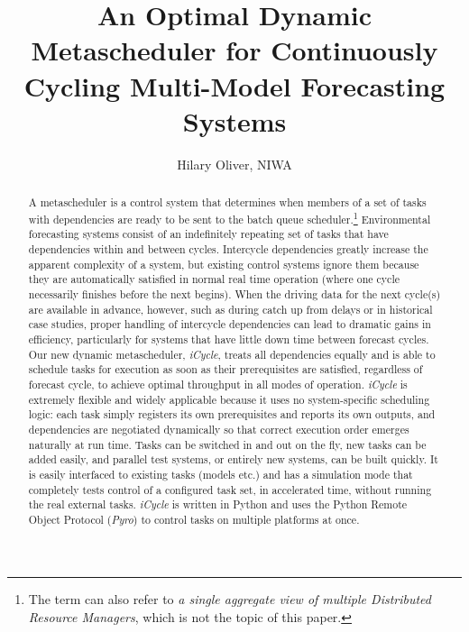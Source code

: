 \documentclass[11pt,a4paper]{article}
\title{An Optimal Dynamic Metascheduler for Continuously Cycling
Multi-Model Forecasting Systems}
\author{Hilary Oliver, NIWA}
\begin{document}
\maketitle

\begin{abstract}

    A metascheduler is a control system that determines when members of
    a set of tasks with dependencies are 
    ready to be sent to the batch queue scheduler.\footnote{The term can
    also refer to {\it a single aggregate view of multiple Distributed
    Resource Managers}, which is not the topic of this paper.}
    Environmental forecasting systems consist of an indefinitely
    repeating set of tasks that have dependencies within and between
    cycles. Intercycle dependencies greatly increase the apparent
    complexity of a system, but existing control systems ignore them
    because they are automatically satisfied in normal real time
    operation (where one cycle necessarily finishes before the next
    begins).  When the driving data for the next cycle(s) are available
    in advance, however, such as during catch up from delays or in
    historical case studies, proper handling of intercycle dependencies
    can lead to dramatic gains in efficiency, particularly for systems
    that have little down time between forecast cycles.  Our new dynamic
    metascheduler, {\em iCycle}, treats all dependencies equally and is
    able to schedule tasks for execution as soon as their prerequisites
    are satisfied, regardless of forecast cycle, to achieve optimal
    throughput in all modes of operation. {\em iCycle} is extremely
    flexible and widely applicable because it uses no system-specific
    scheduling logic: each task simply registers its own prerequisites
    and reports its own outputs, and dependencies are negotiated
    dynamically so that correct execution order emerges naturally at run
    time.  Tasks can be switched in and out on the fly, new tasks can be
    added easily, and parallel test systems, or entirely new systems,
    can be built quickly. It is easily interfaced to existing tasks
    (models etc.) and has a simulation mode that completely tests
    control of a configured task set, in accelerated time, without
    running the real external tasks. {\em iCycle} is written in Python
    and uses the Python Remote Object Protocol ({\em Pyro}) to control
    tasks on multiple platforms at once. 

\end{abstract}
\end{document}
